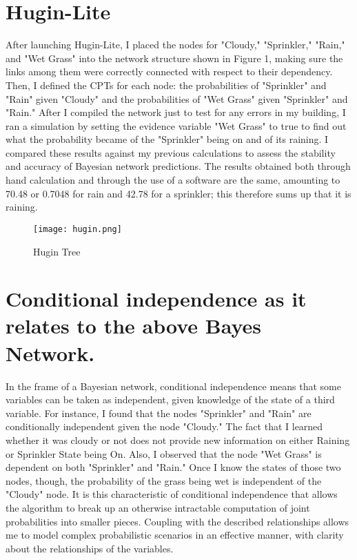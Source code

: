 \documentclass{article}
\begin{document}
\section*{Hugin-Lite}

After launching Hugin-Lite, I placed the nodes for "Cloudy," "Sprinkler," "Rain," and "Wet Grass" into the network structure shown in Figure 1, making sure the links among them were correctly connected with respect to their dependency. Then, I defined the CPTs for each node: the probabilities of "Sprinkler" and "Rain" given "Cloudy" and the probabilities of "Wet Grass" given "Sprinkler" and "Rain." After I compiled the network just to test for any errors in my building, I ran a simulation by setting the evidence variable "Wet Grass" to true to find out what the probability became of the "Sprinkler" being on and of its raining. I compared these results against my previous calculations to assess the stability and accuracy of Bayesian network predictions. The results obtained both through hand calculation and through the use of a software are the same, amounting to 70.48 or 0.7048 for rain and 42.78 for a sprinkler; this therefore sums up that it is raining.

\begin{figure}[H]
    \centering
    \texttt{[image: hugin.png]}
    \caption{Hugin Tree}
    \label{fig:your_label}
\end{figure}

\section*{Conditional independence as it relates to the above Bayes Network.}

In the frame of a Bayesian network, conditional independence means that some variables can be taken as independent, given knowledge of the state of a third variable. For instance, I found that the nodes "Sprinkler" and "Rain" are conditionally independent given the node "Cloudy." The fact that I learned whether it was cloudy or not does not provide new information on either Raining or Sprinkler State being On. Also, I observed that the node "Wet Grass" is dependent on both "Sprinkler" and "Rain." Once I know the states of those two nodes, though, the probability of the grass being wet is independent of the "Cloudy" node. It is this characteristic of conditional independence that allows the algorithm to break up an otherwise intractable computation of joint probabilities into smaller pieces. Coupling with the described relationships allows me to model complex probabilistic scenarios in an effective manner, with clarity about the relationships of the variables.
\end{document}
